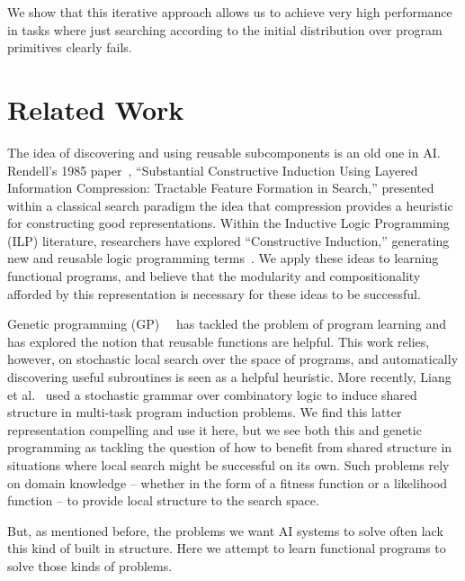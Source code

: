 \documentclass{article}
\begin{document}
We show that this iterative approach allows us to achieve very high
performance in tasks where just searching according to the initial
distribution over program primitives clearly fails.


\section{Related Work}
The idea of discovering and using reusable subcomponents is an old one
in AI. Rendell's 1985 paper~\cite{DBLP:conf/ijcai/Rendell85},
``Substantial Constructive Induction Using Layered Information
Compression: Tractable Feature Formation in Search,'' presented within
a classical search paradigm the idea that compression provides a
heuristic for constructing good representations. Within the Inductive
Logic Programming (ILP) literature, researchers have explored ``Constructive
Induction,'' generating new and reusable logic programming
terms~\cite{DBLP:conf/ijcai/Muggleton87}. We apply these ideas to
learning functional programs, and believe that the modularity and
compositionality afforded by this representation is necessary for
these ideas to be successful.


Genetic programming
(GP)~\cite{DBLP:conf/foga/Koza92}~\cite{DBLP:conf/ices/KozaBAK96} has
tackled the problem of program learning and has explored the notion
that reusable functions are helpful. This work relies, however, on
stochastic local search over the space of programs, and automatically
discovering useful subroutines is seen as a helpful heuristic. More
recently, Liang et al.~\cite{liang10programs} used a stochastic
grammar over combinatory logic to induce shared structure in
multi-task program induction problems. We find this latter
representation compelling and use it here, but we see both this and
genetic programming as tackling the question of how to benefit from
shared structure in situations where local search might be successful
on its own. Such problems rely on domain knowledge -- whether in the
form of a fitness function or a likelihood function -- to provide
local structure to the search space.

But, as mentioned before, the problems we want AI systems to solve
often lack this kind of built in structure. Here we attempt to learn
functional programs to solve those kinds of problems.  \\

\end{document}
